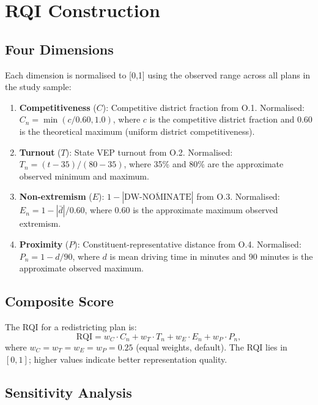 \section{RQI Construction}

\subsection{Four Dimensions}

Each dimension is normalised to [0,1] using the observed range across all
plans in the study sample:

\begin{enumerate}
  \item \textbf{Competitiveness} ($C$): Competitive district fraction from O.1.
    Normalised: $C_n = \min(c / 0.60, 1.0)$, where $c$ is the competitive
    district fraction and 0.60 is the theoretical maximum (uniform district
    competitiveness).
  \item \textbf{Turnout} ($T$): State VEP turnout from O.2.
    Normalised: $T_n = (t - 35) / (80 - 35)$, where 35\% and 80\% are the
    approximate observed minimum and maximum.
  \item \textbf{Non-extremism} ($E$): $1 - |\overline{\text{DW-NOMINATE}}|$
    from O.3.
    Normalised: $E_n = 1 - |\bar{d}| / 0.60$, where 0.60 is the approximate
    maximum observed extremism.
  \item \textbf{Proximity} ($P$): Constituent-representative distance from O.4.
    Normalised: $P_n = 1 - d / 90$, where $d$ is mean driving time in minutes
    and 90 minutes is the approximate observed maximum.
\end{enumerate}

\subsection{Composite Score}

\begin{definition}
\label{def:rqi}
The RQI for a redistricting plan is:
\[
  \mathrm{RQI} = w_C \cdot C_n + w_T \cdot T_n + w_E \cdot E_n + w_P \cdot P_n,
\]
where $w_C = w_T = w_E = w_P = 0.25$ (equal weights, default).
The RQI lies in $[0,1]$; higher values indicate better representation quality.
\end{definition}

\subsection{Sensitivity Analysis}

